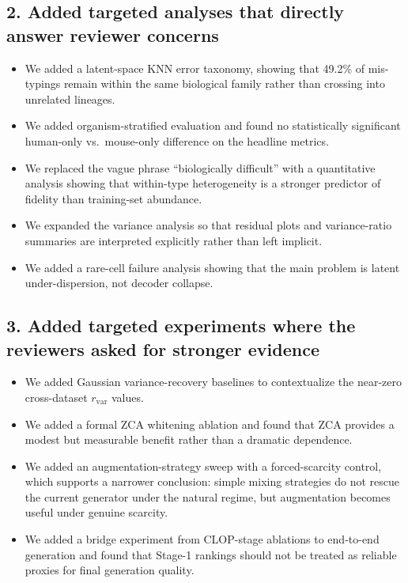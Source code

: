 \documentclass[11pt,letterpaper]{article}
\begin{document}
\subsection*{2. Added targeted analyses that directly answer reviewer concerns}

\begin{itemize}
  \item We added a latent-space KNN error taxonomy, showing that 49.2\% of mis-typings remain
    within the same biological family rather than crossing into unrelated lineages.
  \item We added organism-stratified evaluation and found no statistically significant
    human-only vs.\ mouse-only difference on the headline metrics.
  \item We replaced the vague phrase ``biologically difficult'' with a quantitative analysis
    showing that within-type heterogeneity is a stronger predictor of fidelity than training-set
    abundance.
  \item We expanded the variance analysis so that residual plots and variance-ratio summaries are
    interpreted explicitly rather than left implicit.
  \item We added a rare-cell failure analysis showing that the main problem is latent
    under-dispersion, not decoder collapse.
\end{itemize}

\subsection*{3. Added targeted experiments where the reviewers asked for stronger evidence}

\begin{itemize}
  \item We added Gaussian variance-recovery baselines to contextualize the near-zero
    cross-dataset $r_{\mathrm{var}}$ values.
  \item We added a formal ZCA whitening ablation and found that ZCA provides a modest but
    measurable benefit rather than a dramatic dependence.
  \item We added an augmentation-strategy sweep with a forced-scarcity control, which supports a
    narrower conclusion: simple mixing strategies do not rescue the current generator under the
    natural regime, but augmentation becomes useful under genuine scarcity.
  \item We added a bridge experiment from CLOP-stage ablations to end-to-end generation and found
    that Stage-1 rankings should not be treated as reliable proxies for final generation quality.
\end{itemize}
\end{document}
